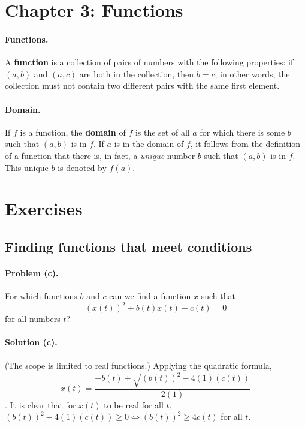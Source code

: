 \documentclass{article}
\begin{document}
\section{Chapter 3: Functions}

\paragraph{Functions.} A \textbf{function} is a collection of pairs of numbers with the following properties: if $(a, b)$ and $(a, c)$ are both in the collection, then $b = c$; in other words, the collection must not contain two different pairs with the same first element.

\paragraph{Domain.} If $f$ is a function, the \textbf{domain} of $f$ is the set of all $a$ for which there is some $b$ such that $(a, b)$ is in $f$. If $a$ is in the domain of $f$, it follows from the definition of a function that there is, in fact, a \emph{unique} number $b$ such that $(a, b)$ is in $f$. This unique $b$ is denoted by $f(a)$.

\section{Exercises}

\setcounter{subsection}{9}
\subsection{Finding functions that meet conditions}

\paragraph{Problem (c).} For which functions $b$ and $c$ can we find a function $x$ such that \begin{equation*}
  (x(t))^2 + b(t)x(t) + c(t) = 0
\end{equation*} for all numbers $t$?

\paragraph{Solution (c).} (The scope is limited to real functions.) Applying the quadratic formula, \begin{equation*}
  x(t) = \frac{-b(t) \pm \sqrt{(b(t))^2 - 4(1)(c(t))}}{2(1)}
\end{equation*}. It is clear that for $x(t)$ to be real for all $t$, $(b(t))^2 - 4(1)(c(t)) \geq 0 \iff (b(t))^2 \geq 4c(t)$ for all $t$.
\end{document}
